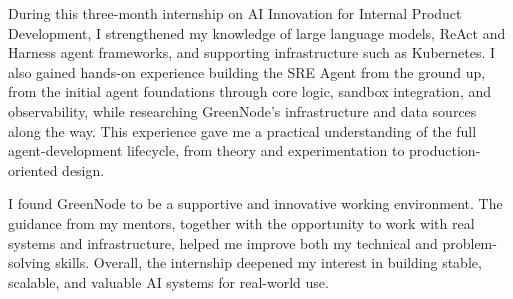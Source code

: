 \documentclass[a4paper]{article}
\theoremstyle{definition}
\begin{document}

During this three-month internship on AI Innovation for Internal Product Development, I strengthened my knowledge of large language models, ReAct and Harness agent frameworks, and supporting infrastructure such as Kubernetes. I also gained hands-on experience building the SRE Agent from the ground up, from the initial agent foundations through core logic, sandbox integration, and observability, while researching GreenNode's infrastructure and data sources along the way. This experience gave me a practical understanding of the full agent-development lifecycle, from theory and experimentation to production-oriented design.

I found GreenNode to be a supportive and innovative working environment. The guidance from my mentors, together with the opportunity to work with real systems and infrastructure, helped me improve both my technical and problem-solving skills. Overall, the internship deepened my interest in building stable, scalable, and valuable AI systems for real-world use.


\end{document}
